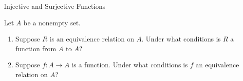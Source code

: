 \begin{section}{Injective and Surjective Functions}
\begin{problem}
Let $A$ be a nonempty set.
\begin{enumerate}[label=\textrm{(\alph*)}]
\item Suppose $R$ is an equivalence relation on $A$. Under what conditions is $R$ a function from $A$ to $A$?
\item Suppose $f:A\to A$ is a function. Under what conditions is $f$ an equivalence relation on $A$?
\end{enumerate}
\end{problem}

\end{section}